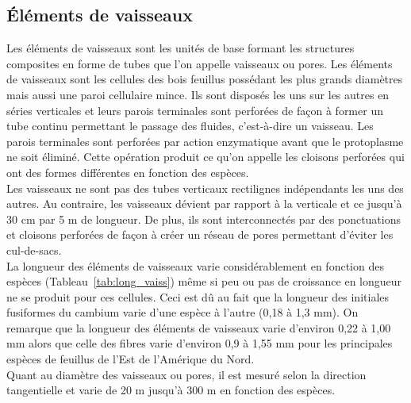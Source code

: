 \subsection{Éléments de vaisseaux}

Les éléments de vaisseaux sont les unités de base formant les structures composites en forme de tubes que l'on appelle vaisseaux ou pores.  Les éléments de vaisseaux sont les cellules des bois feuillus possédant les plus grands diamètres mais aussi une paroi cellulaire mince.  Ils sont disposés les uns sur les autres en séries verticales et leurs parois terminales sont perforées de façon à former un tube continu permettant le passage des fluides, c'est-à-dire un vaisseau. Les parois terminales sont perforées par action enzymatique avant que le protoplasme ne soit éliminé.  Cette opération produit ce qu'on appelle les cloisons perforées qui ont des formes différentes en fonction des espèces.\\

Les vaisseaux ne sont pas des tubes verticaux rectilignes indépendants les uns des autres. Au contraire, les vaisseaux dévient par rapport à la verticale et ce jusqu'à 30 cm par 5 m de longueur.  De plus, ils sont interconnectés par des ponctuations et cloisons perforées de façon à créer un réseau de pores permettant d'éviter les cul-de-sacs.\\

La longueur des éléments de vaisseaux varie considérablement en fonction des espèces (Tableau~\ref{tab:long_vaiss}) même si peu ou pas de croissance en longueur ne se produit pour ces cellules. Ceci est dû au fait que la longueur des initiales fusiformes du cambium varie d'une espèce à l'autre (0,18 à 1,3 mm).  On remarque que la longueur des éléments de vaisseaux varie d'environ 0,22 à 1,00 mm alors que celle des fibres varie d'environ 0,9 à 1,55 mm pour les principales espèces de feuillus de l'Est de l'Amérique du Nord.\\

Quant au diamètre des vaisseaux ou pores, il est mesuré selon la direction tangentielle et varie de 20 \micro m jusqu'à 300 \micro m en fonction des espèces.

